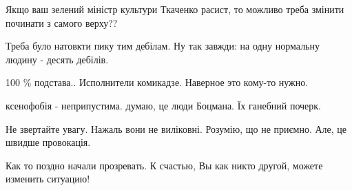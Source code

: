 \begin{itemize}
 
Якщо ваш зелений міністр культури Ткаченко расист, то можливо треба змінити починати з самого верху??

 
Треба було натовкти пику тим дебілам. Ну так завжди: на одну нормальну людину - десять дебілів.

 
100 \% подстава.. Исполнители комикадзе. Наверное это кому-то нужно.

 
ксенофобія - неприпустима. думаю, це люди Боцмана. Їх ганебний почерк.

 
Не звертайте увагу.
Нажаль вони не виліковні.
Розумію, що не приємно. Але, це швидше провокація.

 
Как то поздно начали прозревать. К счастью, Вы как никто другой, можете изменить ситуацию!

 

\end{itemize}
